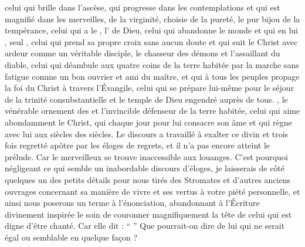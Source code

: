 celui qui brille dans l'ascèse, qui progresse dans les contemplations et qui est magnifié dans les merveilles, %
 de la virginité,
 choisie de la pureté, %
le pur bijou de la tempérance,
celui qui a le ,
l' de Dieu,
celui qui abandonne le monde et qui en lui ,
 seul ,
celui qui  prend sa propre croix sans aucun doute et qui suit le Christ avec ardeur comme un véritable disciple, 
le chasseur des démons et l'assaillant du diable,
celui qui déambule aux quatre coins de la terre habitée par la marche sans fatigue comme un bon ouvrier et ami du maître, 
et qui à tous les peuples propage la foi du Christ à travers l'Évangile,
celui qui se prépare lui-même pour le séjour de la trinité consubstantielle et le temple de Dieu engendré auprès de tous.
, le vénérable ornement des  et l'invincible défenseur de la terre habitée,
celui qui aime abondamment le Christ, qui  chaque jour  pour lui consacre son âme et qui règne avec lui aux siècles des siècles. %
\pend
\pstart
Le discours a travaillé à exalter ce divin et trois fois regretté apôtre  par les éloges de regrets, et il n'a pas encore atteint le prélude.
Car le  merveilleux  se trouve inaccessible aux louanges. %
C'est pourquoi négligeant %
ce qui semble un inabordable discours d'éloges,
 je laisserais  de côté  quelques un des petits détails pour nous tirés des Stromates et d'autres anciens ouvrages  concernant sa manière de vivre et ses vertus  à votre piété personnelle, et ainsi nous poserons un terme à l'énonciation,
abandonnant  à l'Écriture divinement inspirée le soin de couronner magnifiquement la tête de celui qui est digne d'être chanté. %
Car elle dit : \enquote{ }
Que pourrait-on dire de lui qui ne serait égal ou semblable en quelque façon ?
\pend

\pstart

